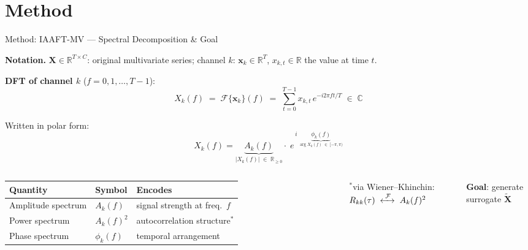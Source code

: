 \documentclass[aspectratio=169,10pt]{beamer}
\begin{document}
\section{Method}
\begin{frame}{Method: IAAFT-MV --- Spectral Decomposition \& Goal}

  \textbf{Notation.}\;
  $\mathbf{X}\!\in\!\mathbb{R}^{T\times C}$: original multivariate series;
  channel $k$: $\mathbf{x}_k\!\in\!\mathbb{R}^{T}$,\;
  $x_{k,t}\in\mathbb{R}$ the value at time $t$.

  \vspace{0.4em}
  \textbf{DFT of channel $k$} \quad ($f = 0, 1, \ldots, T{-}1$):
  \[
    X_k(f)
      \;=\; \mathcal{F}\{\mathbf{x}_k\}(f)
      \;=\; \sum_{t=0}^{T-1} x_{k,t}\, e^{-i 2\pi f t / T}
      \;\in\; \mathbb{C}
  \]

  Written in polar form:
  \[
    X_k(f)
      = \underbrace{A_k(f)}_{\displaystyle |X_k(f)|\;\in\;\mathbb{R}_{\ge 0}}
        \cdot\;
        e^{\,i\;\underbrace{\phi_k(f)}_{\displaystyle \arg X_k(f)\;\in\;[-\pi,\pi)}}
  \]

  \vspace{0.3em}
  \begin{columns}[T]
      \begin{tabular}{@{}lll@{}}
        \toprule
        Quantity & Symbol & Encodes \\
        \midrule
        Amplitude spectrum & $A_k(f)$ & signal strength at freq.\ $f$ \\
        Power spectrum     & $A_k(f)^2$ & autocorrelation structure$^{*}$ \\
        Phase spectrum     & $\phi_k(f)$ & temporal arrangement \\
        \bottomrule
      \end{tabular}

      \vspace{0.2em}
      {\footnotesize $^{*}$via Wiener--Khinchin:
        $R_{kk}(\tau)\;\xleftrightarrow{\;\mathcal{F}\;}\;A_k(f)^2$}

      \textbf{Goal}: generate surrogate $\tilde{\mathbf{X}}$
      \vspace{0.2em}


\end{columns}
\end{frame}
\end{document}
